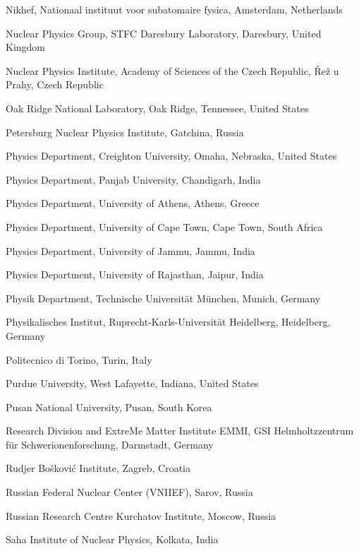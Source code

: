 \begin{flushleft}
\begin{Authlist}
\item {}Nikhef, Nationaal instituut voor subatomaire fysica, Amsterdam, Netherlands
\item {}Nuclear Physics Group, STFC Daresbury Laboratory, Daresbury, United Kingdom
\item {}Nuclear Physics Institute, Academy of Sciences of the Czech Republic, \v{R}e\v{z} u Prahy, Czech Republic
\item {}Oak Ridge National Laboratory, Oak Ridge, Tennessee, United States
\item {}Petersburg Nuclear Physics Institute, Gatchina, Russia
\item {}Physics Department, Creighton University, Omaha, Nebraska, United States
\item {}Physics Department, Panjab University, Chandigarh, India
\item {}Physics Department, University of Athens, Athens, Greece
\item {}Physics Department, University of Cape Town, Cape Town, South Africa
\item {}Physics Department, University of Jammu, Jammu, India
\item {}Physics Department, University of Rajasthan, Jaipur, India
\item {}Physik Department, Technische Universit\"{a}t M\"{u}nchen, Munich, Germany
\item {}Physikalisches Institut, Ruprecht-Karls-Universit\"{a}t Heidelberg, Heidelberg, Germany
\item {}Politecnico di Torino, Turin, Italy
\item {}Purdue University, West Lafayette, Indiana, United States
\item {}Pusan National University, Pusan, South Korea
\item {}Research Division and ExtreMe Matter Institute EMMI, GSI Helmholtzzentrum f\"ur Schwerionenforschung, Darmstadt, Germany
\item {}Rudjer Bo\v{s}kovi\'{c} Institute, Zagreb, Croatia
\item {}Russian Federal Nuclear Center (VNIIEF), Sarov, Russia
\item {}Russian Research Centre Kurchatov Institute, Moscow, Russia
\item {}Saha Institute of Nuclear Physics, Kolkata, India

\end{Authlist}
\end{flushleft}
